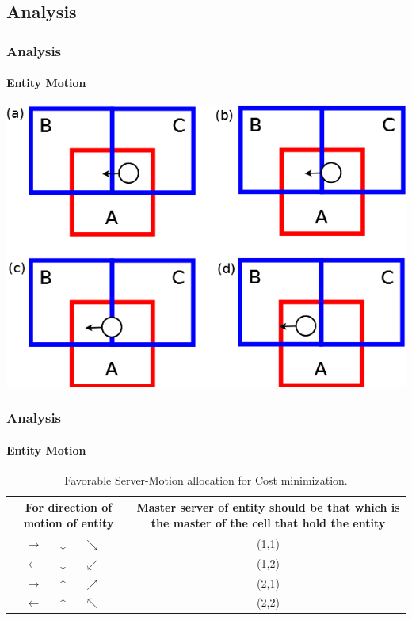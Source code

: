 \subsection{Analysis}

\begin{frame}[fragile]
\frametitle{Analysis}
\framesubtitle{Entity Motion}
\begin{center}
\includegraphics[scale=.80]{motion.png}
\end{center}
\end{frame}

\begin{frame}[fragile]
\frametitle{Analysis}
\framesubtitle{Entity Motion}
\begin{center}
\begin{table}
\caption{Favorable Server-Motion allocation for Cost minimization.}
\begin{tabular}{|c|c|}
\hline
\parbox[t]{4cm}{For direction of motion of entity} &
\parbox[t]{4cm}{Master server of entity should be that
which is the master of the cell that hold the entity} \\
\hline
$\longrightarrow\quad$ $\downarrow\quad$ $\searrow\quad$ & (1,1) \\
\hline
$\longleftarrow\quad$ $\downarrow\quad$ $\swarrow\quad$ & (1,2) \\
\hline
$\longrightarrow\quad$ $\uparrow\quad$ $\nearrow\quad$ & (2,1) \\
\hline
$\longleftarrow\quad$ $\uparrow\quad$ $\nwarrow\quad$ & (2,2) \\
\hline
\end{tabular}
\end{table}
\end{center}
\end{frame}

